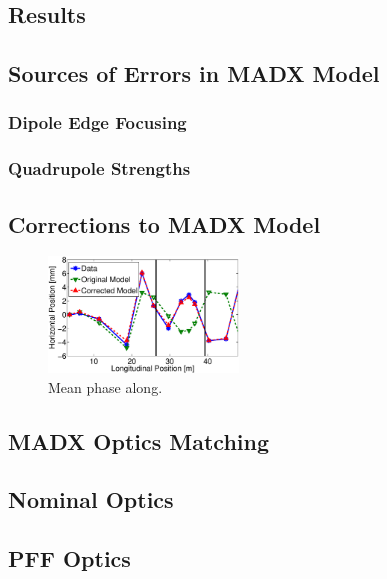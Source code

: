 \subsection{Results}
\label{ss:opticsResults}

\subsection{Sources of Errors in MADX Model}
\label{ss:modelErrorSources}

\subsubsection{Dipole Edge Focusing}
\label{sss:edgeFocusing}

\subsubsection{Quadrupole Strengths}
\label{sss:quadStrengths}

\subsection{Corrections to MADX Model}
\label{ss:modelCorrections}

\begin{figure}
  \centering
  \includegraphics[width=0.45\textwidth]{Figures/opticsCorrVsOrig}
  \caption{Mean phase along.}
  \label{f:opticsCorrVsOrig}
\end{figure}


\subsection{MADX Optics Matching}
\label{ss:madxMatching}

\subsection{Nominal Optics}
\label{ss:nominalMatched}

\subsection{PFF Optics}
\label{ss:pffMatched}


